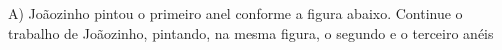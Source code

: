 \documentclass[preview]{standalone}
\begin{document}
\begin{center}
A) Joãozinho pintou o primeiro anel conforme a figura abaixo.
        Continue o trabalho de Joãozinho, pintando,
        na mesma figura, o segundo e o terceiro anéis
\end{center}
\end{document}
